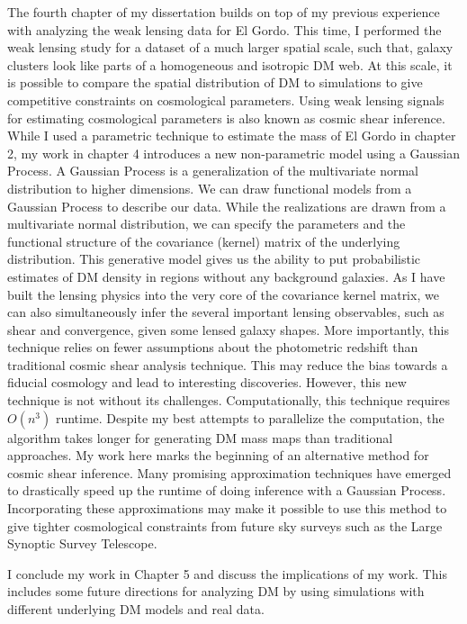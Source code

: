 \documentclass[ucdthesis.tex]{subfiles}
\begin{document}
			The fourth chapter of my dissertation builds on top of my previous experience
			with analyzing the weak lensing data for El Gordo. This time, I performed 
			the weak lensing study for a dataset of a much larger spatial scale, 
			such that, galaxy
		clusters look like parts of a homogeneous and isotropic DM web. At this scale,
		it is possible to compare the spatial distribution of DM to simulations to give 
		competitive constraints on cosmological parameters. Using weak lensing
		signals for estimating cosmological parameters is also known as cosmic shear 
		inference. While I used a parametric technique to estimate the mass of El
		Gordo in chapter 2, 
		my work in chapter 4 introduces a new non-parametric model using a Gaussian Process.
		A Gaussian Process is a generalization of the multivariate normal distribution 
		to higher dimensions. We can draw functional models from a Gaussian Process
		to describe our data. While the realizations are drawn from a multivariate
		normal distribution,  we can specify the parameters and the
		functional structure of the covariance (kernel) matrix of the underlying 
		distribution. 
		This generative model gives us the ability to put probabilistic estimates 
		of DM density in regions without any background galaxies. 
		As I have built the lensing physics into the 
		very core of the covariance kernel matrix, we can also simultaneously infer the
		several important lensing observables, such as shear and convergence, 
		given some lensed galaxy shapes. 
		More importantly, this technique relies on fewer assumptions about the
		photometric redshift than traditional cosmic shear analysis technique. 
		This may reduce
		the bias towards a fiducial cosmology and lead to interesting discoveries.
		However, this new technique is not without its challenges. Computationally,
		this technique requires $O(n^3)$ runtime. Despite my best attempts to
		parallelize the computation, the algorithm takes longer for
	  generating DM mass maps than traditional approaches. My work here
		marks the beginning of an alternative method for cosmic
		shear inference. Many promising approximation techniques have emerged to 
		drastically speed up the runtime of doing inference with a Gaussian Process.
		Incorporating these approximations may make it possible to use this method 
		to give tighter cosmological constraints  
		from future sky surveys such as the Large Synoptic Survey Telescope.  

		I conclude my work in Chapter 5 and discuss the implications of my work.
		This includes some future directions for analyzing DM
		by using simulations with different underlying DM
		models and real data. 
\end{document}
